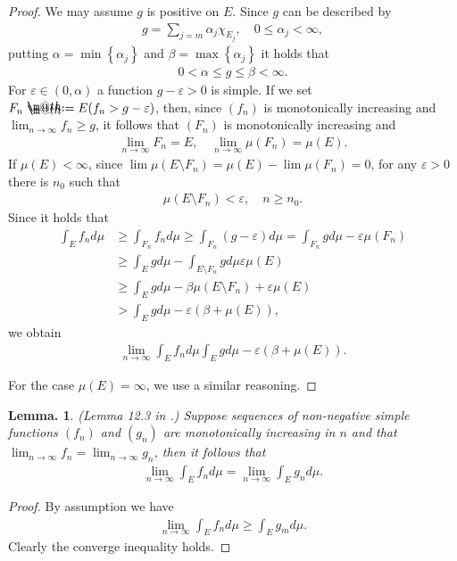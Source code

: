 \documentclass[openany, a4paper, oneside]{jsbook}
\makeatletter
\newcommand*{\defeq}{\mathrel{\rlap{%
\raisebox{0.3ex}{$\m@th\cdot$}}%
\raisebox{-0.3ex}{$\m@th\cdot$}}%
=}
\theoremstyle{break}
\theoremstyle{breakdefn}
\newtheorem{lem}[thm]{Lemma.}
\newcommand{\rbk}[1]{\left (#1\right)}
\newcommand{\cbk}[1]{\left\{#1\right\}}
\makeatother
\begin{document}
\begin{proof}
We may assume $g$ is positive on $E$.
Since $g$ can be described by
\begin{align}
 g
 =
 \sum_{j=m} \alpha_j \chi_{E_j}, \quad 0 \leq \alpha_j < \infty,
\end{align}
putting $\alpha = \min \cbk{\alpha_j}$ and $\beta = \max \cbk{\alpha_j}$ it holds that
\begin{align}
 0 < \alpha \leq g \leq \beta < \infty.
\end{align}
For $\varepsilon \in (0, \alpha)$ a function $g - \varepsilon > 0$ is simple.
If we set $F_n \defeq E (f_n > g - \varepsilon)$, then, since $(f_n)$ is monotonically increasing and $\lim_{n \to \infty} f_n \geq g$, it follows that
$(F_n)$ is monotonically increasing and
\begin{align}
 \lim_{n \to \infty} F_n = E, \quad
 \lim_{n \to \infty} \mu (F_n) = \mu (E).
\end{align}
If $\mu (E) < \infty$, since $\lim \mu (E \setminus F_n) = \mu (E) - \lim \mu (F_n) = 0$, for any $\varepsilon > 0$ there is $n_0$ such that
\begin{align}
 \mu \rbk{E \setminus F_n} < \varepsilon, \quad n \geq n_0.
\end{align}
Since it holds that
\begin{align}
 \int_E f_n d \mu
 &\geq \int_{F_n} f_n d \mu
 \geq
 \int_{F_n} (g - \varepsilon) d\mu
 =
 \int_{F_n} g d \mu - \varepsilon \mu (F_n) \\
 &\geq
 \int_E g d \mu - \int_{E \setminus F_n} g d \mu \varepsilon \mu (E) \\
 &\geq
 \int_E g d \mu - \beta \mu \rbk{E \setminus F_n} + \varepsilon \mu (E) \\
 &>
 \int_E g d \mu - \varepsilon \rbk{ \beta + \mu (E)},
\end{align}
we obtain
\begin{align}
 \lim_{n \to \infty} \int_E f_n d \mu
 \int_E g d\mu - \varepsilon \rbk{\beta + \mu (E)}.
\end{align}

For the case $\mu (E) = \infty$, we use a similar reasoning.
\end{proof}

\begin{lem}\textup{(Lemma 12.3 in \cite{SeizoIto1}.)}
 Suppose sequences of non-negative simple functions $(f_n)$ and $(g_n)$ are monotonically increasing in $n$
 and that $\lim_{n \to \infty} f_n = \lim_{n \to \infty} g_n$, then it follows that
 \begin{align}
  \lim_{n \to \infty} \int_E f_n d \mu
  =
  \lim_{n \to \infty} \int_E g_n d \mu.
 \end{align}
\end{lem}
\begin{proof}
By assumption we have
\begin{align}
 \lim_{n \to \infty} \int_E f_n d\mu
 \geq
 \int_E g_m d \mu.
\end{align}
Clearly the converge inequality holds.
\end{proof}
\end{document}
